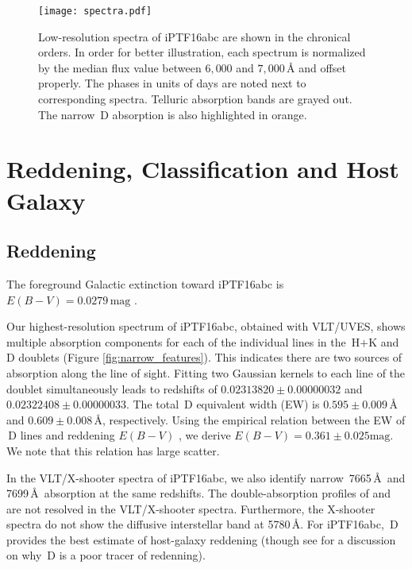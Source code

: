 \documentclass[twocolumn]{aastex61}
\begin{document}
\begin{figure*}[!htb]
  \centering
  \texttt{[image: spectra.pdf]}
  \caption{Low-resolution spectra of iPTF16abc are shown in the
    chronical orders. In order for better illustration, each spectrum
    is normalized by the median flux value between $6,000$ and
    $7,000\,\textrm{\AA}$ and offset properly.  The phases in units of
    days are noted next to corresponding spectra. Telluric absorption
    bands are grayed out. The narrow \,D absorption is also
    highlighted in orange.}
  \label{fig:spec_seq}
\end{figure*}


\section{Reddening, Classification and Host Galaxy}
\label{sec:usual_staff}

\subsection{Reddening}
\label{sec:reddening}

The foreground Galactic extinction toward iPTF16abc
is $E(B-V)=0.0279\,\mathrm{mag}$ \citep{2011ApJ...737..103S}.

Our highest-resolution spectrum of iPTF16abc, obtained with VLT/UVES, shows multiple absorption components for each of the individual lines in the \,H$+$K and \,D doublets (Figure \ref{fig:narrow_features}). This indicates there are two sources of absorption along the line of sight. Fitting
two Gaussian kernels to each line of the  doublet
simultaneously leads to redshifts of $0.02313820\pm0.00000032$ and
$0.02322408\pm0.00000033$. The total \,D equivalent width (EW) is $0.595\pm0.009\,\textrm{\AA}$ and
$0.609\pm0.008\,\textrm{\AA}$, respectively. Using the empirical
relation between the EW of \,D lines and
reddening $E(B-V)$ \citep{2012MNRAS.426.1465P}, we derive
$E(B-V)=0.361\pm0.025\textrm{mag}$. We note that this relation has large scatter.

In the VLT/X-shooter spectra of iPTF16abc, we also identify narrow \,7665\,\AA\ and 7699\,\AA\ absorption at the same
redshifts. The double-absorption profiles of 
and  are not resolved in the VLT/X-shooter spectra. Furthermore, the X-shooter spectra do not show the diffusive
interstellar band at 5780\,\AA. For iPTF16abc, \,D provides the best estimate of host-galaxy reddening (though see \citealt{2013ApJ...779...38P} for a discussion on why \,D is a poor tracer of redenning).
\end{document}
